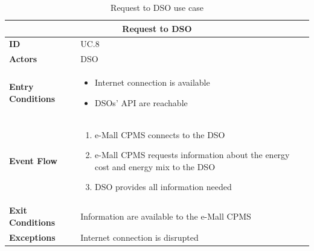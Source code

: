 \documentclass[12pt]{report}
\begin{document}
    \clearpage
    \begin{table}[h]
        \centering
        \begin{tabular}{ |p{4cm}|p{11cm}|  }
        \hline
        \multicolumn{2}{|c|}{\textbf{Request to DSO}} \\
        \hline
            \textbf{ID} &  UC.8\\
        \hline
            \textbf{Actors} & DSO\\
        \hline
            \textbf{Entry Conditions} &
                \begin{itemize}
                    \item Internet connection is available
                    \item DSOs’ API are reachable
                \end{itemize}\\
        \hline
            \textbf{Event Flow} &
                \begin{enumerate}
                    \item e-Mall CPMS connects to the DSO
                    \item e-Mall CPMS requests information about the energy cost and energy mix to the DSO
                    \item DSO provides all information needed
                \end{enumerate}\\
        \hline
            \textbf{Exit Conditions} & Information are available to the e-Mall CPMS\\
        \hline
            \textbf{Exceptions} & Internet connection is disrupted\\
        \hline
        \end{tabular}
        \caption{\label{demo-table}Request to DSO use case}
    \end{table}
\end{document}
